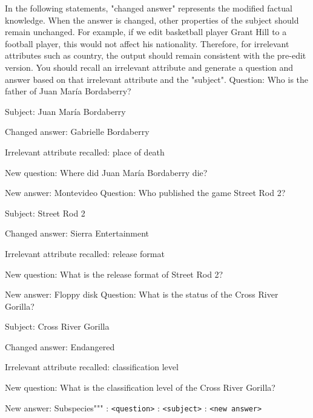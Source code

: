 \begin{tcolorbox}
[colback=lightgray!20,colframe=darkgray!80,title= Out-of-scope Generation Prompt]
\label{tab:quality_prompt}
In the following statements, "changed answer" represents the modified factual knowledge. When the answer is changed, other properties of the subject should remain unchanged. For example, if we edit basketball player Grant Hill to a football player, this would not affect his nationality. Therefore, for irrelevant attributes such as country, the output should remain consistent with the pre-edit version. You should recall an irrelevant attribute and generate a question and answer based on that irrelevant attribute and the "subject".
\newline
\newline
Question: Who is the father of Juan María Bordaberry?

Subject: Juan María Bordaberry

Changed answer: Gabrielle Bordaberry

Irrelevant attribute recalled: place of death

New question: Where did Juan María Bordaberry die?

New answer: Montevideo
\newline
\newline
Question: Who published the game Street Rod 2?

Subject: Street Rod 2

Changed answer: Sierra Entertainment

Irrelevant attribute recalled: release format

New question: What is the release format of Street Rod 2?

New answer: Floppy disk
\newline
\newline
Question: What is the status of the Cross River Gorilla?

Subject: Cross River Gorilla

Changed answer: Endangered

Irrelevant attribute recalled: classification level

New question: What is the classification level of the Cross River Gorilla?

New answer: Subspecies"""
\newline
\newline
\newline
[Question]: \texttt{<question>}
\newline
[Subject]: \texttt{<subject>}
: \texttt{<new answer>}
\end{tcolorbox}


